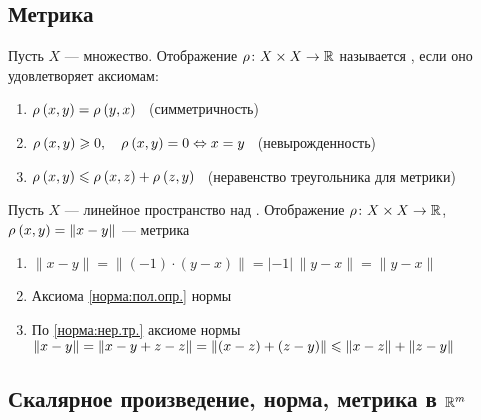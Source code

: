 \subsection{Метрика}

\begin{opr}\label{опр:метр.} %
	Пусть $X$ --- множество. Отображение $\rho\colon X \times X \to \mathbb R$ называется , если оно удовлетворяет аксиомам:
	\begin{enumerate} %
		\item {} 
		$\rho_{}\left(x,y\right) = \rho_{}\left(y,x\right)$
		\ {\footnotesize(симметричность)}
		
		\item {} 
		$\rho_{}\left(x,y\right)\geqslant 0, \quad \rho_{}\left(x,y\right) = 0 \Leftrightarrow x = y$
		\ {\footnotesize(невырожденность)}
		
		\item {} 
		$\rho_{}\left(x,y\right) \leqslant \rho_{}\left(x,z\right) + \rho_{}\left(z,y\right)$
		\ {\footnotesize(неравенство треугольника для метрики)}
	\end{enumerate} %
\end{opr} %

\begin{utv}\label{метр.:норма} %
	Пусть $X$ --- линейное пространство над \rr. Отображение $\rho\colon X \times X \to \mathbb R$,  $\rho_{}\left(x,y\right) = \|x-y\|$ --- метрика
\end{utv}

\begin{prf}
	\begin{enumerate}
		\item {} 
		$\|x - y\| = \|(-1)\cdot (y - x)\| = |-1|\,\|y - x\| = \|y - x\|$
		
		\item Аксиома \ref{норма:пол.опр.} нормы
		
		\item По \ref{норма:нер.тр.} аксиоме нормы  
		$\|x - y\| = \|x - y + z - z\| = \|(x - z) + (z - y)\| \leqslant \|x - z\| + \|z - y\|$ 
	\end{enumerate} %
\end{prf}

\subsection{Скалярное произведение, норма, метрика в $\mathbb R^m$}

